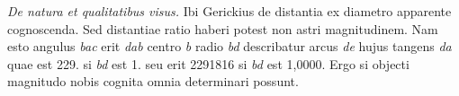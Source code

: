                         \pstart 
         \textit{De natura et qualitatibus visus.} Ibi Gerickius\protect{} de distantia ex
                                  diametro apparente cognoscenda. Sed distantiae  ratio haberi potest non  astri magnitudinem. Nam esto 
                      angulus \textit{bac}  erit \textit{dab}  centro \textit{b} radio \textit{bd} describatur arcus \textit{de} hujus tangens \textit{da}  quae est 229. si \textit{bd}  est 1. seu erit 2291816  si \textit{bd} est 1,0000.  Ergo si objecti magnitudo nobis cognita  omnia determinari possunt. 
                      \pend